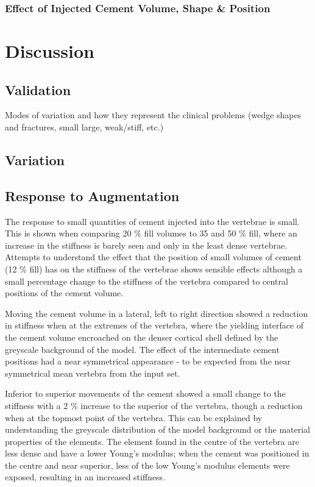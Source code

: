 \subsubsection{Effect of Injected Cement Volume, Shape \& Position}		


\pagebreak


\section{Discussion}
\label{pca_disc}

\subsection{Validation}

Modes of variation and how they represent the clinical problems (wedge shapes and fractures, small large, weak/stiff, etc.)

\subsection{Variation}

\subsection{Response to Augmentation}

The response to small quantities of cement injected into the vertebrae is small. This is shown when comparing 20 \% fill volumes to 35 and 50 \% fill, where an increase in the stiffness is barely seen and only in the least dense vertebrae.
Attempts to understand the effect that the position of small volumes of cement (12 \% fill) has on the stiffness of the vertebrae shows sensible effects although a small percentage change to the stiffness of the vertebra compared to central positions of the cement volume.



Moving the cement volume in a lateral, left to right direction showed a reduction in stiffness when at the extremes of the vertebra, where the yielding interface of the cement volume encroached on the denser cortical shell defined by the greyscale background of the model.
The effect of the intermediate cement positions had a near symmetrical appearance - to be expected from the near symmetrical mean vertebra from the input set.

Inferior to superior movements of the cement showed a small change to the stiffness with a 2 \% increase to the superior of the vertebra, though a reduction when at the topmost point of the vertebra.
This can be explained by understanding the greyscale distribution of the model background or the material properties of the elements.
The element found in the centre of the vertebra are less dense and have a lower Young's modulus; when the cement was positioned in the centre and near superior, less of the low Young's modulus elements were exposed, resulting in an increased stiffness.

